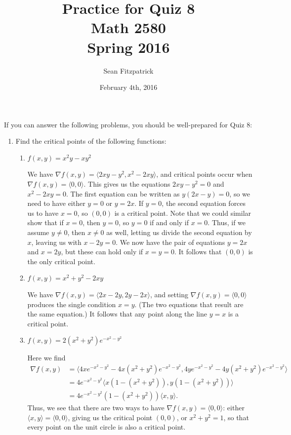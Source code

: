 \documentclass[letterpaper,12pt]{article}
\title{Practice for Quiz 8\\Math 2580\\Spring 2016}
\author{Sean Fitzpatrick}
\date{February 4th, 2016}
\begin{document}
 \maketitle

If you can answer the following problems, you should be well-prepared for Quiz 8:



\begin{enumerate}
 \item Find the critical points of the following functions:
\begin{enumerate}
 \item $f(x,y) = x^2y-xy^2$

\bigskip

We have $\nabla f(x,y) = \langle 2xy-y^2, x^2-2xy\rangle$, and critical points occur when $\nabla f(x,y) = \langle 0,0\rangle$. This gives us the equations $2xy-y^2=0$ and $x^2-2xy=0$. The first equation can be written as $y(2x-y)=0$, so we need to have either $y=0$ or $y=2x$. If $y=0$, the second equation forces us to have $x=0$, so $(0,0)$ is a critical point. Note that we could similar show that if $x=0$, then $y=0$, so $y=0$ if and only if $x=0$. Thus, if we assume $y\neq 0$, then $x\neq 0$ as well, letting us divide the second equation by $x$, leaving us with $x-2y=0$. We now have the pair of equations $y=2x$ and $x=2y$, but these can hold only if $x=y=0$. It follows that $(0,0)$ is the only critical point.

\bigskip

 \item $f(x,y) = x^2+y^2-2xy$

\bigskip

We have $\nabla f(x,y) = \langle 2x-2y, 2y-2x\rangle$, and setting $\nabla f(x,y)=\langle 0,0\rangle$ produces the single condition $x=y$. (The two equations that result are the same equation.) It follows that any point along the line $y=x$ is a critical point.

\bigskip

 \item $f(x,y) = 2(x^2+y^2)e^{-x^2-y^2}$

\bigskip

Here we find 
\begin{align*}
\nabla f(x,y) &= \langle 4xe^{-x^2-y^2}-4x(x^2+y^2)e^{-x^2-y^2},4ye^{-x^2-y^2}-4y(x^2+y^2)e^{-x^2-y^2}\rangle  \\
& = 4e^{-x^2-y^2}\langle x(1-(x^2+y^2)), y(1-(x^2+y^2))\rangle\\
& = 4e^{-x^2-y^2}(1-(x^2+y^2))\langle x, y\rangle.
\end{align*}
Thus, we see that there are two ways to have $\nabla f(x,y)=\langle 0,0\rangle$: either $\langle x,y\rangle = \langle 0,0\rangle$, giving us the critical point $(0,0)$, or $x^2+y^2=1$, so that every point on the unit circle is also a critical point.


\end{enumerate}
\end{enumerate}
\end{document}
